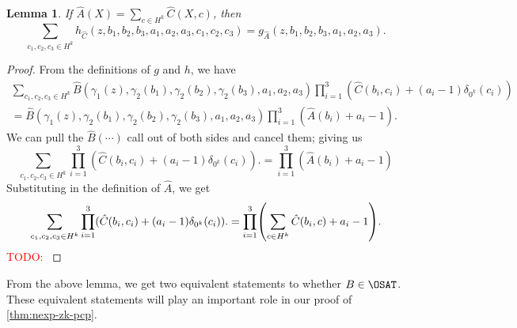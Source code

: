 \documentclass[english,12pt]{reedthesis}
\theoremstyle{plain}
\newtheorem{lemma}[lemma]{Lemma}
\theoremstyle{definition}
\theoremstyle{remark}
\newcommand{\TODO}[1]{\textcolor{red}{TODO: #1}}
\begin{document}
\begin{lemma}\label{lem:g_a-vs-h_c}
  If $\hat{A}(X) = \sum_{c \in H^{k}}\hat{C}(X, c)$, then
  \begin{equation}\label{eqn:g_a-vs-h_c}
    \sum_{c_{1}, c_{2}, c_{3} \in H^{k}}h_{\hat{C}}(z, b_{1}, b_{2}, b_{3}, a_{1}, a_{2}, a_{3}, c_{1}, c_{2}, c_{3})
    = g_{\hat{A}}(z, b_{1}, b_{2}, b_{3}, a_{1}, a_{2}, a_{3}).
  \end{equation}
\end{lemma}

\begin{proof}
  From the definitions of $g$ and $h$, we have
  \begin{multline}\label{eqn:expand-gh-defs}
    \sum_{c_{1}, c_{2}, c_{3} \in H^{k}}\hat{B}(\gamma_{1}(z), \gamma_{2}(b_{1}), \gamma_{2}(b_{2}), \gamma_{2}(b_{3}), a_{1}, a_{2}, a_{3})
    \prod_{i=1}^{3}(\hat{C}(b_{i}, c_{i}) + (a_{i} - 1)\delta_{0^{k}}(c_{i})) \\
    = \hat{B}(\gamma_{1}(z), \gamma_{2}(b_{1}), \gamma_{2}(b_{2}), \gamma_{2}(b_{3}), a_{1}, a_{2}, a_{3})
    \prod_{i=1}^{3}(\hat{A}(b_{i}) + a_{i} - 1).
  \end{multline}
  We can pull the $\hat{B}(\cdots)$ call out of both sides and cancel them; giving us
  \begin{equation}\label{eqn:cancel-b-call}
    \sum_{c_{1}, c_{2}, c_{3} \in H^{k}}\prod_{i=1}^{3}(\hat{C}(b_{i}, c_{i}) + (a_{i} - 1)\delta_{0^{k}}(c_{i})).
    = \prod_{i=1}^{3}(\hat{A}(b_{i}) + a_{i} - 1)
  \end{equation}
  Substituting in the definition of $\hat{A}$, we get
  \begin{equation}\label{eqn:subst-a-def}
    \sum_{c_{1}, c_{2}, c_{3} \in H^{k}}\prod_{i=1}^{3}(\hat{C}(b_{i}, c_{i}) + (a_{i} - 1)\delta_{0^{k}}(c_{i})).
    = \prod_{i=1}^{3}\mleft(\sum_{c \in H^{k}}\hat{C}(b_{i}, c) + a_{i} - 1\mright).
  \end{equation}
  \TODO{}
\end{proof}

From the above lemma, we get two equivalent statements to whether $B \in \OSAT$.
These equivalent statements will play an important role in our proof of
\cref{thm:nexp-zk-pcp}.
\end{document}
